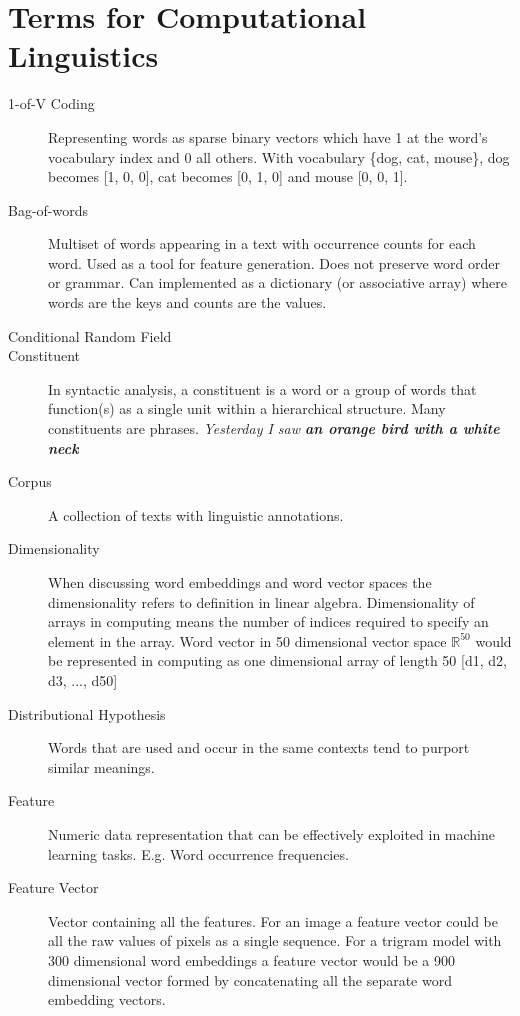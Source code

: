 \documentclass[12pt,a4paper,english
]{tutthesis}
\begin{document}
\section{Terms for Computational Linguistics}
\begin{description}
\item[1-of-V Coding] Representing words as sparse binary vectors which have 1 at the word's vocabulary index and 0 all others. With vocabulary \{dog, cat, mouse\}, dog becomes [1, 0, 0], cat becomes [0, 1, 0] and mouse [0, 0, 1].

\item[Bag-of-words] Multiset of words appearing in a text with occurrence counts for each word. Used as a tool for feature generation. Does not preserve word order or grammar. Can implemented as a dictionary (or associative array) where words are the keys and counts are the values.

\item[Conditional Random Field]

\item[Constituent] In syntactic analysis, a constituent is a word or a group of words that function(s) as a single unit within a hierarchical structure. Many constituents are phrases. \textit{Yesterday I saw \textbf{an orange bird with a white neck}}

\item[Corpus] A collection of texts with linguistic annotations.

\item[Dimensionality] When discussing word embeddings and word vector spaces the dimensionality refers to definition in linear algebra. Dimensionality of arrays in computing means the number of indices required to specify an element in the array. Word vector in 50 dimensional vector space $\mathbb{R}^{50}$ would be represented in computing as one dimensional array of length 50 [d1, d2, d3, ..., d50]

\item[Distributional Hypothesis] Words that are used and occur in the same contexts tend to purport similar meanings. \cite{Harris1954}

\item[Feature] Numeric data representation that can be effectively exploited in machine learning tasks. E.g. Word occurrence frequencies.

\item[Feature Vector] Vector containing all the features. For an image a feature vector could be all the raw values of pixels as a single sequence. For a trigram model with 300 dimensional word embeddings a feature vector would be a 900 dimensional vector formed by concatenating all the separate word embedding vectors.


\end{description}
\end{document}
